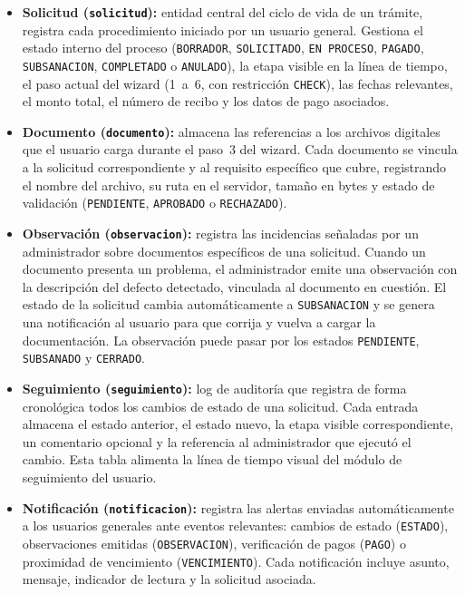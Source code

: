 \begin{itemize}
  \item \textbf{Solicitud (\texttt{solicitud}):} entidad central del ciclo de vida de
        un trámite, registra cada procedimiento iniciado por un usuario general. Gestiona
        el estado interno del proceso (\texttt{BORRADOR}, \texttt{SOLICITADO},
        \texttt{EN~PROCESO}, \texttt{PAGADO}, \texttt{SUBSANACION}, \texttt{COMPLETADO}
        o \texttt{ANULADO}), la etapa visible en la línea de tiempo, el paso actual del
        wizard (1~a~6, con restricción \texttt{CHECK}), las fechas relevantes, el monto
        total, el número de recibo y los datos de pago asociados.

  \item \textbf{Documento (\texttt{documento}):} almacena las referencias a los archivos
        digitales que el usuario carga durante el paso~3 del wizard. Cada documento se
        vincula a la solicitud correspondiente y al requisito específico que cubre,
        registrando el nombre del archivo, su ruta en el servidor, tamaño en bytes y
        estado de validación (\texttt{PENDIENTE}, \texttt{APROBADO} o
        \texttt{RECHAZADO}).

  \item \textbf{Observación (\texttt{observacion}):} registra las incidencias señaladas
        por un administrador sobre documentos específicos de una solicitud. Cuando un
        documento presenta un problema, el administrador emite una observación con la
        descripción del defecto detectado, vinculada al documento en cuestión. El estado
        de la solicitud cambia automáticamente a \texttt{SUBSANACION} y se genera una
        notificación al usuario para que corrija y vuelva a cargar la documentación.
        La observación puede pasar por los estados \texttt{PENDIENTE},
        \texttt{SUBSANADO} y \texttt{CERRADO}.

  \item \textbf{Seguimiento (\texttt{seguimiento}):} log de auditoría que registra de
        forma cronológica todos los cambios de estado de una solicitud. Cada entrada
        almacena el estado anterior, el estado nuevo, la etapa visible correspondiente,
        un comentario opcional y la referencia al administrador que ejecutó el cambio.
        Esta tabla alimenta la línea de tiempo visual del módulo de seguimiento del
        usuario.

  \item \textbf{Notificación (\texttt{notificacion}):} registra las alertas enviadas
        automáticamente a los usuarios generales ante eventos relevantes: cambios de
        estado (\texttt{ESTADO}), observaciones emitidas (\texttt{OBSERVACION}),
        verificación de pagos (\texttt{PAGO}) o proximidad de vencimiento
        (\texttt{VENCIMIENTO}). Cada notificación incluye asunto, mensaje, indicador
        de lectura y la solicitud asociada.
\end{itemize}

